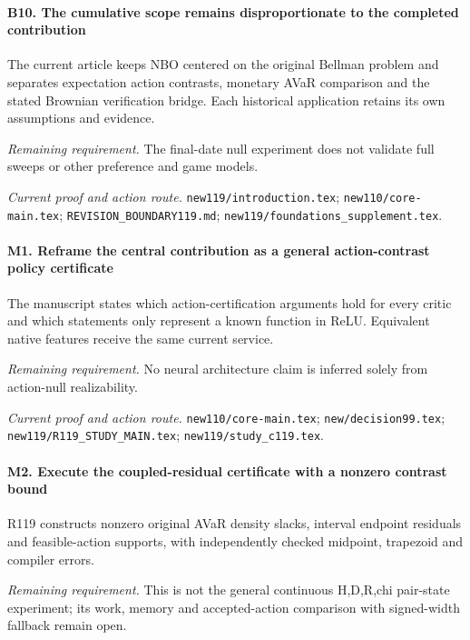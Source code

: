 \paragraph{B10. The cumulative scope remains disproportionate to the completed contribution}

The current article keeps NBO centered on the original Bellman problem and separates expectation action contrasts, monetary AVaR comparison and the stated Brownian verification bridge. Each historical application retains its own assumptions and evidence.

\par\emph{Remaining requirement.} The final-date null experiment does not validate full sweeps or other preference and game models.

\par\emph{Current proof and action route.} \nolinkurl{new119/introduction.tex}; \nolinkurl{new110/core-main.tex}; \nolinkurl{REVISION_BOUNDARY119.md}; \nolinkurl{new119/foundations_supplement.tex}.

\paragraph{M1. Reframe the central contribution as a general action-contrast policy certificate}

The manuscript states which action-certification arguments hold for every critic and which statements only represent a known function in ReLU. Equivalent native features receive the same current service.

\par\emph{Remaining requirement.} No neural architecture claim is inferred solely from action-null realizability.

\par\emph{Current proof and action route.} \nolinkurl{new110/core-main.tex}; \nolinkurl{new/decision99.tex}; \nolinkurl{new119/R119_STUDY_MAIN.tex}; \nolinkurl{new119/study_c119.tex}.

\paragraph{M2. Execute the coupled-residual certificate with a nonzero contrast bound}

R119 constructs nonzero original AVaR density slacks, interval endpoint residuals and feasible-action supports, with independently checked midpoint, trapezoid and compiler errors.

\par\emph{Remaining requirement.} This is not the general continuous H,D,R,chi pair-state experiment; its work, memory and accepted-action comparison with signed-width fallback remain open.

